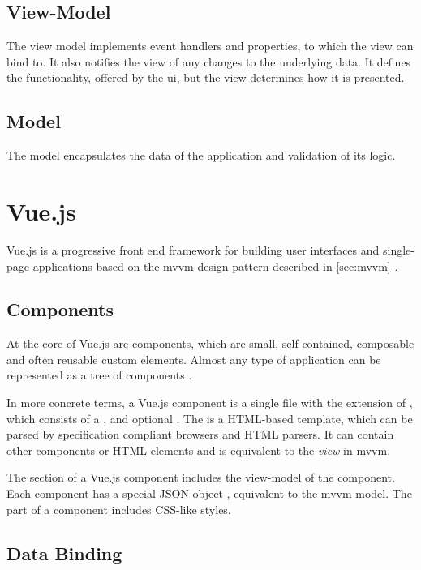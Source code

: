 \subsection{View-Model}
The view model implements event handlers and properties, to which the view can bind to. It also notifies the view of any changes to the underlying data. It defines the functionality, offered by the \gls{ui}, but the view determines how it is presented. 
\subsection{Model}
The model encapsulates the data of the application and validation of its logic.


\section{Vue.js}

Vue.js \parencite{vuejs_gh} is a progressive front end framework for building user interfaces and single-page applications based on the \gls{mvvm} design pattern described in \ref{sec:mvvm} \parencite{vuejs_book} \parencite{vuejs_guide}.  

\subsection{Components}
At the core of Vue.js are components, which are small, self-contained, composable and often reusable custom elements. Almost any type of application can be represented as a tree of components \parencite{vuejs_guide}. 

In more concrete terms, a Vue.js component is a single file with the extension of , which consists of a ,  and optional . The  is a HTML-based template, which can be parsed by specification compliant browsers and HTML parsers. It can contain other components or HTML elements and is equivalent to the \textit{view} in \gls{mvvm}. 

The  section of a Vue.js component includes the view-model of the component. Each component has a special JSON object , equivalent to the \gls{mvvm} model.
The  part of a component includes CSS-like styles.

\subsection{Data Binding}

